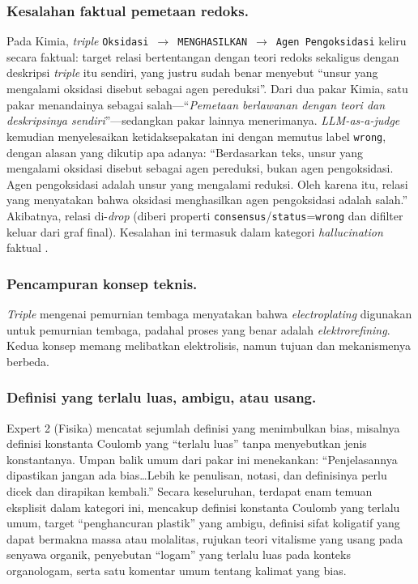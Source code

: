\documentclass[../../thesis]{subfiles}
\begin{document}
\subsubsection{Kesalahan faktual pemetaan redoks.} Pada Kimia, \textit{triple}
\texttt{Oksidasi}~$\rightarrow$~\texttt{MENGHASILKAN}~$\rightarrow$~\texttt{Agen Pengoksidasi}
keliru secara faktual: target relasi bertentangan dengan teori redoks sekaligus dengan
deskripsi \textit{triple} itu sendiri, yang justru sudah benar menyebut ``unsur yang
mengalami oksidasi disebut sebagai agen pereduksi''. Dari dua pakar Kimia, satu pakar
menandainya sebagai salah---``\textit{Pemetaan berlawanan dengan teori dan deskripsinya
sendiri}''---sedangkan pakar lainnya menerimanya. \textit{LLM-as-a-judge} kemudian
menyelesaikan ketidaksepakatan ini dengan memutus label \texttt{wrong}, dengan alasan
yang dikutip apa adanya: ``Berdasarkan teks, unsur yang mengalami oksidasi disebut
sebagai agen pereduksi, bukan agen pengoksidasi. Agen pengoksidasi adalah unsur yang
mengalami reduksi. Oleh karena itu, relasi yang menyatakan bahwa oksidasi menghasilkan
agen pengoksidasi adalah salah.'' Akibatnya, relasi di-\textit{drop} (diberi properti
\texttt{consensus}/\texttt{status}=\texttt{wrong} dan difilter keluar dari graf final).
Kesalahan ini termasuk dalam kategori \textit{hallucination} faktual
\parencite{ji_survey_2023, min_factscore_2023}.

\subsubsection{Pencampuran konsep teknis.} \textit{Triple} mengenai pemurnian tembaga menyatakan
bahwa \textit{electroplating} digunakan untuk pemurnian tembaga, padahal proses yang
benar adalah \textit{elektrorefining}. Kedua konsep memang melibatkan elektrolisis,
namun tujuan dan mekanismenya berbeda.

\subsubsection{Definisi yang terlalu luas, ambigu, atau usang.} Expert 2 (Fisika) mencatat sejumlah definisi yang
menimbulkan bias, misalnya definisi konstanta Coulomb yang ``terlalu luas'' tanpa
menyebutkan jenis konstantanya. Umpan balik umum dari pakar ini menekankan:
``Penjelasannya dipastikan jangan ada bias\ldots Lebih ke penulisan, notasi, dan
definisinya perlu dicek dan dirapikan kembali.'' Secara keseluruhan, terdapat
enam temuan eksplisit dalam kategori ini, mencakup definisi konstanta Coulomb yang
terlalu umum, target ``penghancuran plastik'' yang ambigu, definisi sifat
koligatif yang dapat bermakna massa atau molalitas, rujukan teori vitalisme yang
usang pada senyawa organik, penyebutan ``logam'' yang terlalu luas pada konteks
organologam, serta satu komentar umum tentang kalimat yang bias.
\end{document}
